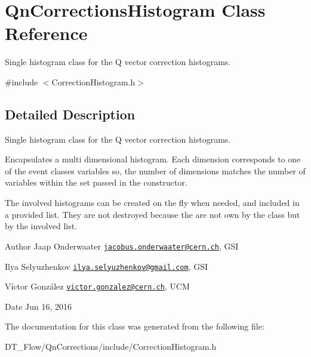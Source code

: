\hypertarget{classQnCorrectionsHistogram}{}\section{Qn\+Corrections\+Histogram Class Reference}
\label{classQnCorrectionsHistogram}


Single histogram class for the Q vector correction histograms.  




{\ttfamily \#include $<$Correction\+Histogram.\+h$>$}



\subsection{Detailed Description}
Single histogram class for the Q vector correction histograms. 

Encapsulates a multi dimensional histogram. Each dimension corresponds to one of the event classes variables so, the number of dimensions matches the number of variables within the set passed in the constructor.

The involved histograms can be created on the fly when needed, and included in a provided list. They are not destroyed because the are not own by the class but by the involved list.

\begin{DoxyAuthor}{Author}
Jaap Onderwaater \href{mailto:jacobus.onderwaater@cern.ch}{\tt jacobus.\+onderwaater@cern.\+ch}, G\+SI 

Ilya Selyuzhenkov \href{mailto:ilya.selyuzhenkov@gmail.com}{\tt ilya.\+selyuzhenkov@gmail.\+com}, G\+SI 

Víctor González \href{mailto:victor.gonzalez@cern.ch}{\tt victor.\+gonzalez@cern.\+ch}, U\+CM 
\end{DoxyAuthor}
\begin{DoxyDate}{Date}
Jun 16, 2016 
\end{DoxyDate}


The documentation for this class was generated from the following file\+:\begin{DoxyCompactItemize}
\item 
D\+T\+\_\+\+Flow/\+Qn\+Corrections/include/Correction\+Histogram.\+h\end{DoxyCompactItemize}
